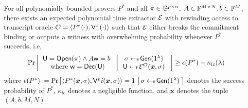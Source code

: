 \begin{lemma}[Soundness]\label{lem:linercheck_sound}
For all polynomially bounded provers $P^\ast$ and all $\pi\in \mathbb{G}^{p\times n}$,
$A\in \mathbb{F}^{M\times N}, b\in \mathbb{F}^M$, there exists an expected polynomial time
extractor $\mathcal{E}$ with rewinding access to transcript oracle $\mathcal{O}=\langle
P^\ast(\cdot),\mathsf{V}^\pi(\cdot)\rangle$ such that $\mathcal{E}$ either breaks the 
commitment binding or outputs a witness with overwhelming probability whenever 
$P^\ast$ succeeds, i.e,
{\small
\begin{align*}
\condprob{\begin{array}{c}
\ewit=\open(\pi)\wedge A\wit=b \\
\text{ where } \wit=\dec(\ewit)
\end{array}
}{
\begin{array}{c}
\sigma\sample \gen(\secparam) \\
\ewit\sample \extr^{\mc{O}}(\bm{x},\sigma)
\end{array}}\geq
\epsilon(P^\ast)-\kappa_{lc}(\secpar)
\end{align*}
}
where $\epsilon(P^\ast):= \condprob{\langle P^\ast(\bm{x},\sigma),\verifier^pi(\bm{x},\sigma)\rangle=1}{\sigma\sample \gen(\secparam)}$ denotes the success probability of $P^\ast$, $\kappa_{lc}$ denotes a negligible function, and $\bm{x}$ denotes the tuple $(A,b,M,N)$.
\end{lemma}
